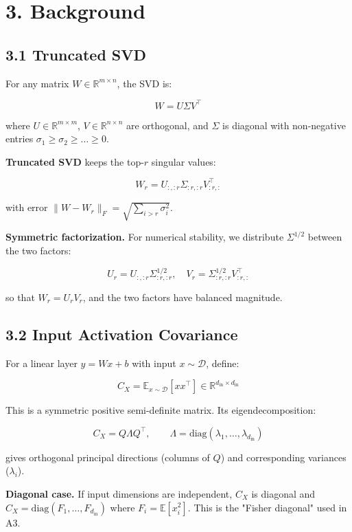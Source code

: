 
\section{3. Background}

\subsection{3.1 Truncated SVD}

For any matrix $W \in \mathbb{R}^{m \times n}$, the SVD is:

\[
W = U \Sigma V^\top
\tag{3.1}
\]

where $U \in \mathbb{R}^{m \times m}$, $V \in \mathbb{R}^{n \times n}$ are 
orthogonal, and $\Sigma$ is diagonal with non-negative entries 
$\sigma_1 \geq \sigma_2 \geq \dots \geq 0$.

\textbf{Truncated SVD} keeps the top-$r$ singular values:

\[
W_r = U_{:, :r} \Sigma_{:r, :r} V_{:r, :}^\top
\tag{3.2}
\]

with error $\|W - W_r\|_F = \sqrt{\sum_{i > r} \sigma_i^2}$.

\textbf{Symmetric factorization.} For numerical stability, we distribute 
$\Sigma^{1/2}$ between the two factors:

\[
U_r = U_{:, :r} \Sigma_{:r, :r}^{1/2}, \quad
V_r = \Sigma_{:r, :r}^{1/2} V_{:r, :}^\top
\tag{3.3}
\]

so that $W_r = U_r V_r$, and the two factors have balanced magnitude.

\subsection{3.2 Input Activation Covariance}

For a linear layer $y = Wx + b$ with input $x \sim \mathcal{D}$, define:

\[
C_X = \mathbb{E}_{x \sim \mathcal{D}}\!\left[x x^\top\right] \in \mathbb{R}^{d_\text{in} \times d_\text{in}}
\tag{3.4}
\]

This is a symmetric positive semi-definite matrix. Its eigendecomposition:

\[
C_X = Q \Lambda Q^\top, \qquad
\Lambda = \mathrm{diag}(\lambda_1, \dots, \lambda_{d_\text{in}})
\tag{3.5}
\]

gives orthogonal principal directions (columns of $Q$) and corresponding 
variances ($\lambda_i$).

\textbf{Diagonal case.} If input dimensions are independent, $C_X$ is diagonal and 
$C_X = \mathrm{diag}(F_1, \dots, F_{d_\text{in}})$ where $F_i = \mathbb{E}[x_i^2]$. 
This is the "Fisher diagonal" used in A3.

